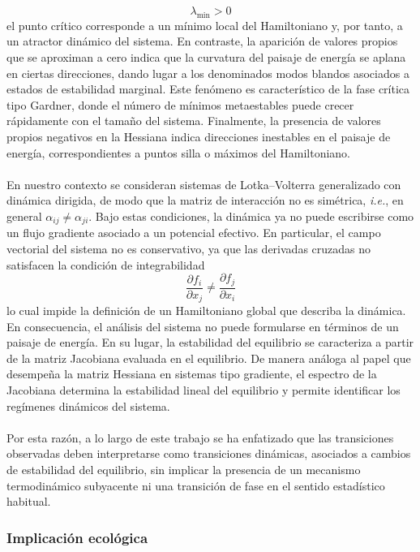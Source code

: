 $$\lambda_{\min}>0$$
el punto crítico corresponde a un mínimo local del Hamiltoniano y, por tanto, a un atractor dinámico del sistema. En contraste, la aparición de valores propios que se aproximan a cero indica que la curvatura del paisaje de energía se aplana en ciertas direcciones, dando lugar a los denominados modos blandos asociados a estados de estabilidad marginal. Este fenómeno es característico de la fase crítica tipo Gardner, donde el número de mínimos metaestables puede crecer rápidamente con el tamaño del sistema. Finalmente, la presencia de valores propios negativos en la Hessiana indica direcciones inestables en el paisaje de energía, correspondientes a puntos silla o máximos del Hamiltoniano.
\\
\\
En nuestro contexto se consideran sistemas de Lotka--Volterra generalizado con dinámica dirigida, de modo que la matriz de interacción no es simétrica, \emph{i.e.}, en general $\alpha_{ij}\neq\alpha_{ji}$. Bajo estas condiciones, la dinámica ya no puede escribirse como un flujo gradiente asociado a un potencial efectivo.  En particular, el campo vectorial del sistema no es conservativo, ya que las derivadas cruzadas no satisfacen la condición de integrabilidad
$$\frac{\partial f_i}{\partial x_j}\neq\frac{\partial f_j}{\partial x_i}$$
lo cual impide la definición de un Hamiltoniano global que describa la dinámica. En consecuencia, el análisis del sistema no puede formularse en términos de un paisaje de energía. En su lugar, la estabilidad del equilibrio se caracteriza a partir de la matriz Jacobiana evaluada en el equilibrio. De manera análoga al papel que desempeña la matriz Hessiana en sistemas tipo gradiente, el espectro de la Jacobiana determina la estabilidad lineal del equilibrio y permite identificar los regímenes dinámicos del sistema.\\
\\
Por esta razón, a lo largo de este trabajo se ha enfatizado que las transiciones observadas deben interpretarse como transiciones dinámicas, asociados a cambios de estabilidad del equilibrio, sin implicar la presencia de un mecanismo termodinámico subyacente ni una transición de fase en el sentido estadístico habitual.

\subsubsection*{Implicación ecológica}

